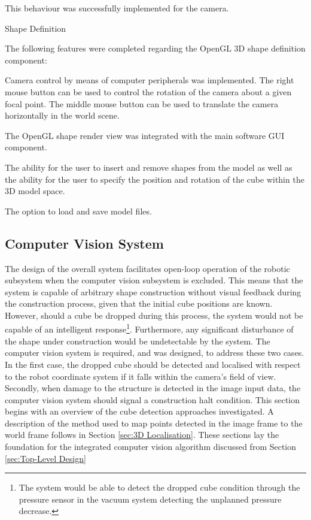 This behaviour was successfully implemented for the camera.

Shape Definition

The following features were completed regarding the OpenGL 3D shape definition component:

\begin{compactitem}
	\item Camera control by means of computer peripherals was implemented. The right mouse button can be used to control the rotation of the camera about a given focal point. The middle mouse button can be used to translate the camera horizontally in the world scene.
	\item The OpenGL shape render view was integrated with the main software GUI component.
	\item The ability for the user to insert and remove shapes from the model as well as the ability for the user to specify the position and rotation of the cube within the 3D model space.
	\item The option to load and save model files.
\end{compactitem}

\subsection{Computer Vision System}

The design of the overall system facilitates open-loop operation of the robotic subsystem when the computer vision subsystem is excluded. This means that the system is capable of arbitrary shape construction without visual feedback during the construction process, given that the initial cube positions are known. However, should a cube be dropped during this process, the system would not be capable of an intelligent response\footnote{The system would be able to detect the dropped cube condition through the pressure sensor in the vacuum system detecting the unplanned pressure decrease.}. Furthermore, any significant disturbance of the shape under construction would be undetectable by the system. The computer vision system is required, and was designed, to address these two cases. In the first case, the dropped cube should be detected and localised with respect to the robot coordinate system if it falls within the camera's field of view. Secondly, when damage to the structure is detected in the image input data, the computer vision system should signal a construction halt condition. This section begins with an overview of the cube detection approaches investigated. A description of the method used to map points detected in the image frame to the world frame follows in Section \ref{sec:3D Localisation}. These sections lay the foundation for the integrated computer vision algorithm discussed from Section \ref{sec:Top-Level Design}

